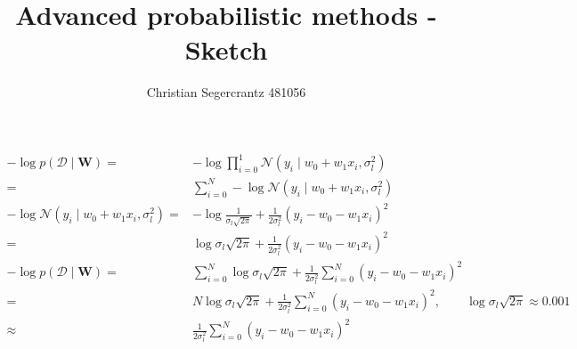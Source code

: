 \documentclass{article}
\title{Advanced probabilistic methods - Sketch}
\author{Christian Segercrantz 481056}
\begin{document}
	\maketitle
	\pagebreak
\begin{align}
	-\log p(\mathcal{D}\mid \mathbf{W}) =& -\log\prod_{i=0}^1 \mathcal{N}(y_i\mid w_0 + w_1x_i, \sigma_l^2) \\
	=& \sum_{i=0}^N-\log \mathcal{N}(y_i\mid w_0 + w_1x_i, \sigma_l^2)\\
	-\log \mathcal{N}(y_i\mid w_0 + w_1x_i, \sigma_l^2) =& -\log\frac{1}{\sigma_l \sqrt{2\pi}} +\frac{1}{2\sigma_l^2}(y_i -w_0-w_1x_i)^2\\
	=& \log\sigma_l \sqrt{2\pi} +\frac{1}{2\sigma_l^2}(y_i -w_0-w_1x_i)^2\\
	-\log p(\mathcal{D}\mid \mathbf{W}) =& \sum_{i=0}^N\log\sigma_l \sqrt{2\pi} +\frac{1}{2\sigma_l^2}\sum_{i=0}^N(y_i -w_0-w_1x_i)^2 \\
	=& N\log\sigma_l \sqrt{2\pi} +\frac{1}{2\sigma_l^2}\sum_{i=0}^N(y_i -w_0-w_1x_i)^2, \qquad \log \sigma_l\sqrt{2\pi} \approx 0.001\\
	\approx & \frac{1}{2\sigma_l^2}\sum_{i=0}^N(y_i -w_0-w_1x_i)^2 
\end{align}
\end{document}
